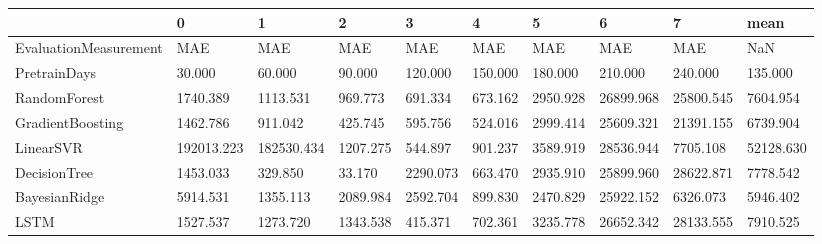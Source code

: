 \begin{tabular}{llllllllll}
\toprule
{} &          0 &          1 &        2 &        3 &       4 &        5 &         6 &         7 &      mean \\
\midrule
EvaluationMeasurement &        MAE &        MAE &      MAE &      MAE &     MAE &      MAE &       MAE &       MAE &       NaN \\
PretrainDays          &     30.000 &     60.000 &   90.000 &  120.000 & 150.000 &  180.000 &   210.000 &   240.000 &   135.000 \\
RandomForest          &   1740.389 &   1113.531 &  969.773 &  691.334 & 673.162 & 2950.928 & 26899.968 & 25800.545 &  7604.954 \\
GradientBoosting      &   1462.786 &    911.042 &  425.745 &  595.756 & 524.016 & 2999.414 & 25609.321 & 21391.155 &  6739.904 \\
LinearSVR             & 192013.223 & 182530.434 & 1207.275 &  544.897 & 901.237 & 3589.919 & 28536.944 &  7705.108 & 52128.630 \\
DecisionTree          &   1453.033 &    329.850 &   33.170 & 2290.073 & 663.470 & 2935.910 & 25899.960 & 28622.871 &  7778.542 \\
BayesianRidge         &   5914.531 &   1355.113 & 2089.984 & 2592.704 & 899.830 & 2470.829 & 25922.152 &  6326.073 &  5946.402 \\
LSTM                  &   1527.537 &   1273.720 & 1343.538 &  415.371 & 702.361 & 3235.778 & 26652.342 & 28133.555 &  7910.525 \\
\bottomrule
\end{tabular}
